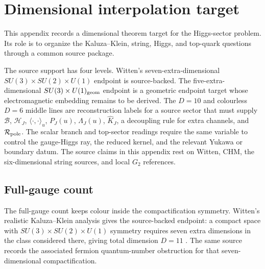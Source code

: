 \section{Dimensional interpolation target}
\label{app:dimensional-interpolation}

This appendix records a dimensional theorem target for the Higgs-sector
problem.  Its role is to organize the Kaluza--Klein, string, Higgs, and
top-quark questions through a common source package.

The source support has four levels.  Witten's seven-extra-dimensional
\(SU(3)\times SU(2)\times U(1)\) endpoint is source-backed.  The
five-extra-dimensional \(SU(3)\times U(1)_{\rm geom}\) endpoint is a geometric
endpoint target whose electromagnetic embedding remains to be derived.  The
\(D=10\) and colourless \(D=6\) middle lines are reconstruction labels for a
source sector that must supply \(\mathcal B\), \(\mathcal H_J\),
\(\langle\cdot,\cdot\rangle_u\), \(P_J(u)\), \(\Lambda_J(u)\),
\(\widehat K_J\), a decoupling rule for extra channels, and
\(\mathcal R_{\rm pole}\).  The scalar branch and top-sector readings require
the same variable to control the gauge-Higgs ray, the reduced kernel, and the
relevant Yukawa or boundary datum.  The source claims in this appendix rest on
Witten, CHM, the six-dimensional string sources, and local
\(G_2\) references.

\subsection{Full-gauge count}
\label{app:full-gauge-count}

The full-gauge count keeps colour inside the compactification symmetry.  Witten's
realistic Kaluza--Klein analysis gives the source-backed endpoint: a compact
space with \(SU(3)\times SU(2)\times U(1)\) symmetry requires seven extra
dimensions in the class considered there, giving total dimension \(D=11\)
\cite{WittenKK1981}.  The same source records the associated fermion
quantum-number obstruction for that seven-dimensional compactification.


